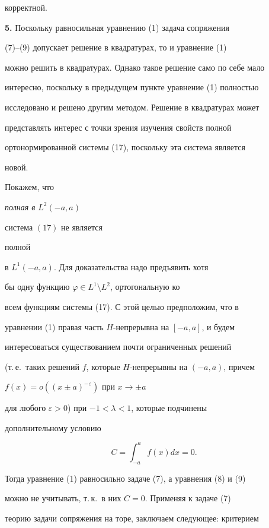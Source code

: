 корректной.


\medskip








{\bf 5.} Поскольку равносильная уравнению (1) задача сопряжения


(7)--(9) допускает решение в квадратурах, то и уравнение (1)


можно решить в квадратурах. Однако такое решение само по себе мало


интересно, поскольку в предыдущем пункте уравнение (1) полностью


исследовано и решено другим методом. Решение в квадратурах  может


представлять интерес с точки зрения изучения свойств полной


ортонормированной системы (17), поскольку эта система является


новой.





Покажем, что {\it полная в $L^{2}(-a,a)$


система $(17)$ не является


полной} в $L^{1}(-a,a)$. Для доказательства надо предъявить хотя


бы одну функцию $\varphi\in L^{1}\setminus L^{2}$, ортогональную ко


всем функциям системы (17). С этой целью предположим, что в


уравнении (1) правая часть $H$-непрерывна на $[-a,a]$, и будем


интересоваться существованием почти ограниченных решений


(т.\,е.\ таких решений $f$, которые $H$-непрерывны на $(-a,a)$, причем


$f(x)=o\left((x\pm a)^{-\varepsilon}\right)$ при $x\rightarrow \pm a$


для любого $\varepsilon>0$) при $-1<\lambda<1$, которые подчинены


дополнительному условию


$$


C=\int^{a}_{-a}f(x)dx=0.


$$


Тогда уравнение (1) равносильно задаче (7), а уравнения (8) и (9)


можно не учитывать, т.\,к.\ в них $C=0$. Применяя к задаче (7)


теорию задачи сопряжения на торе, заключаем следующее: критерием


